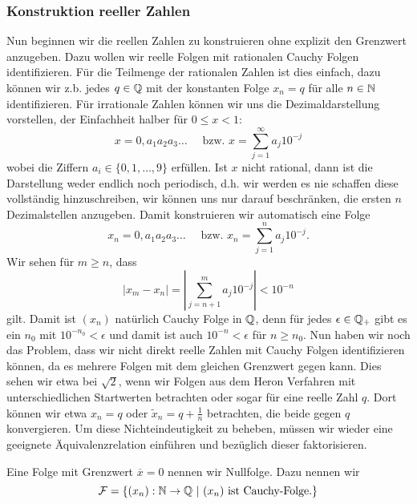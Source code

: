 \subsubsection{Konstruktion reeller Zahlen}
\label{\detokenize{grundlagen/zahlensysteme:konstruktion-reeller-zahlen}}
Nun beginnen wir die reellen Zahlen zu konstruieren ohne explizit den Grenzwert anzugeben. Dazu wollen wir reelle Folgen mit rationalen Cauchy Folgen identifizieren. Für die Teilmenge der rationalen Zahlen ist dies einfach, dazu können wir z.b. jedes \(q \in \mathbb{Q}\) mit der konstanten Folge \(x_n = q\) für alle \(n \in \mathbb{N}\) identifizieren. Für irrationale Zahlen können wir uns die Dezimaldarstellung vorstellen, der Einfachheit halber für \(0\leq x <1\):
\begin{equation*}
x = 0,a_1a_2a_3 \ldots  \quad \text{ bzw. } x=\sum_{j=1}^\infty a_j 10^{-j}
\end{equation*}
wobei die Ziffern \(a_i \in \{0,1,\ldots,9\}\) erfüllen. Ist \(x\) nicht rational, dann ist die Darstellung weder endlich noch periodisch, d.h. wir werden es nie schaffen diese vollständig hinzuschreiben, wir können uns nur darauf beschränken, die ersten \(n\) Dezimalstellen anzugeben. Damit konstruieren wir automatisch eine Folge
\begin{equation*}
x_n = 0,a_1a_2a_3 \ldots  \quad \text{ bzw. } x_n=\sum_{j=1}^n a_j 10^{-j} .
\end{equation*}
Wir sehen für \(m \geq n\), dass
\begin{equation*}
|x_m -x_n| = | \sum_{j=n+1}^m a_j 10^{-j}| < 10^{-n}
\end{equation*}
gilt. Damit ist \((x_n)\) natürlich Cauchy Folge in \(\mathbb{Q}\), denn für jedes \(\epsilon \in \mathbb{Q}_+\) gibt es ein \(n_0\) mit
\(10^{-n_0} < \epsilon \) und damit ist auch \(10^{-n} < \epsilon\) für \(n \geq n_0\).
Nun haben wir noch das Problem, dass wir nicht direkt reelle Zahlen mit Cauchy Folgen identifizieren können, da es mehrere Folgen mit dem gleichen Grenzwert gegen kann. Dies sehen wir etwa bei \(\sqrt{2}\), wenn wir Folgen aus dem Heron Verfahren mit unterschiedlichen Startwerten betrachten oder sogar für eine reelle Zahl \(q\). Dort können wir etwa \(x_n=q\) oder \(\tilde x_n = q +\frac{1}n\) betrachten, die beide gegen \(q\) konvergieren. Um diese Nichteindeutigkeit zu beheben, müssen wir wieder eine geeignete Äquivalenzrelation einführen und bezüglich dieser faktorisieren.
\label{grundlagen/zahlensysteme:definition-17}
\begin{definition}{}{}



Eine Folge mit Grenzwert \(\overline{x}=0\) nennen wir Nullfolge. Dazu nennen wir
\begin{equation*}
 {\cal F} = \{ (x_n): \mathbb{N} \rightarrow \mathbb{Q}~|~(x_n) \text{ ist Cauchy-Folge.}\}
\end{equation*}\end{definition}

